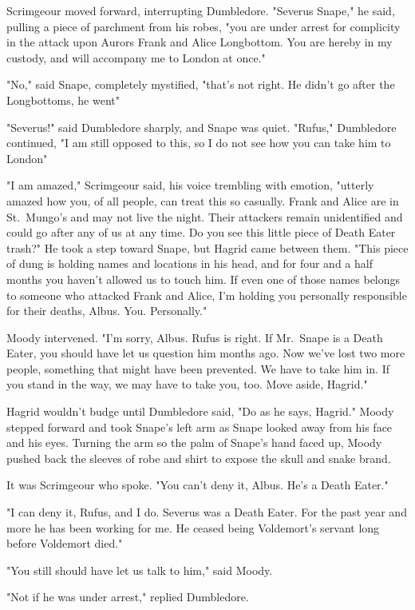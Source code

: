 Scrimgeour moved forward, interrupting Dumbledore. "Severus Snape," he said, pulling a piece of parchment from his robes, "you are under arrest for complicity in the attack upon Aurors Frank and Alice Longbottom. You are hereby in my custody, and will accompany me to London at once."

"No," said Snape, completely mystified, "that's not right. He didn't go after the Longbottoms, he went{\el}"

"Severus!" said Dumbledore sharply, and Snape was quiet. "Rufus," Dumbledore continued, "I am still opposed to this, so I do not see how you can take him to London{\el}"

"I am amazed," Scrimgeour said, his voice trembling with emotion, "utterly amazed how you, of all people, can treat this so casually. Frank and Alice are in St.~Mungo's and may not live the night. Their attackers remain unidentified and could go after any of us at any time. Do you see this little piece of Death Eater trash?" He took a step toward Snape, but Hagrid came between them. "This piece of dung is holding names and locations in his head, and for four and a half months you haven't allowed us to touch him. If even one of those names belongs to someone who attacked Frank and Alice, I'm holding you personally responsible for their deaths, Albus. You. Personally."

Moody intervened. "I'm sorry, Albus. Rufus is right. If Mr.~Snape is a Death Eater, you should have let us question him months ago. Now we've lost two more people, something that might have been prevented. We have to take him in. If you stand in the way, we may have to take you, too. Move aside, Hagrid."

Hagrid wouldn't budge until Dumbledore said, "Do as he says, Hagrid." Moody stepped forward and took Snape's left arm as Snape looked away from his face and his eyes. Turning the arm so the palm of Snape's hand faced up, Moody pushed back the sleeves of robe and shirt to expose the skull and snake brand.

It was Scrimgeour who spoke. "You can't deny it, Albus. He's a Death Eater."

"I can deny it, Rufus, and I do. Severus was a Death Eater. For the past year and more he has been working for me. He ceased being Voldemort's servant long before Voldemort died."

"You still should have let us talk to him," said Moody.

"Not if he was under arrest," replied Dumbledore.

